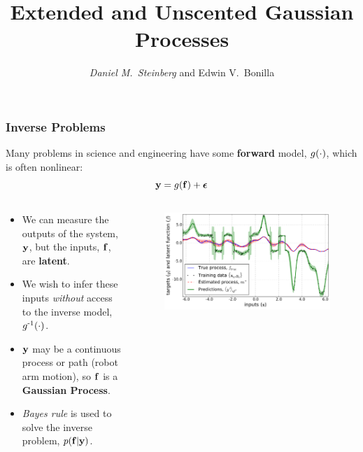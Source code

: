 \documentclass{beamer}
\begin{document}

\title{Extended and Unscented Gaussian Processes}
\author{\textit{Daniel M.\ Steinberg} and
        Edwin V.\ Bonilla}

\date{}


\begin{frame}
    \titlepage
\end{frame}



\begin{frame}
    \frametitle{Inverse Problems}

Many problems in science and engineering have some \textbf{forward} 
model, $g\!\left({{\cdot}}\right)$, which is often nonlinear:
\begin{equation*}
    \mathbf{y} = g\!\left({{\mathbf{f}}}\right) + \boldsymbol\epsilon
\end{equation*}
\vspace{-8mm}
\begin{columns}

\begin{column}{0.5\linewidth}
\footnotesize
\vspace{-5mm}

\begin{itemize}
    \item We can measure the outputs of the system, $\mathbf{y}$, but the inputs,
        $\mathbf{f}$, are \textbf{latent}.
    \item We wish to infer these inputs \emph{without} access to the inverse
        model, $g^{\text{-}1}\!\left({{\cdot}}\right)$.
    \item $\mathbf{y}$ may be a continuous process or path (robot arm motion), 
        so $\mathbf{f}$ is a \textbf{Gaussian Process}.
    \item \emph{Bayes rule} is used to solve the inverse problem,
        $p\!\left({\mathbf{f}}\middle\vert{\ensuremath{\mathbf{y}}}\right)$.
\end{itemize}

\end{column}

\begin{column}{0.5\linewidth}

\begin{figure}
    \includegraphics[width=0.75\linewidth]{fig/signdemo}


\end{figure}
\end{column}
\end{columns}
\end{frame}
\end{document}

